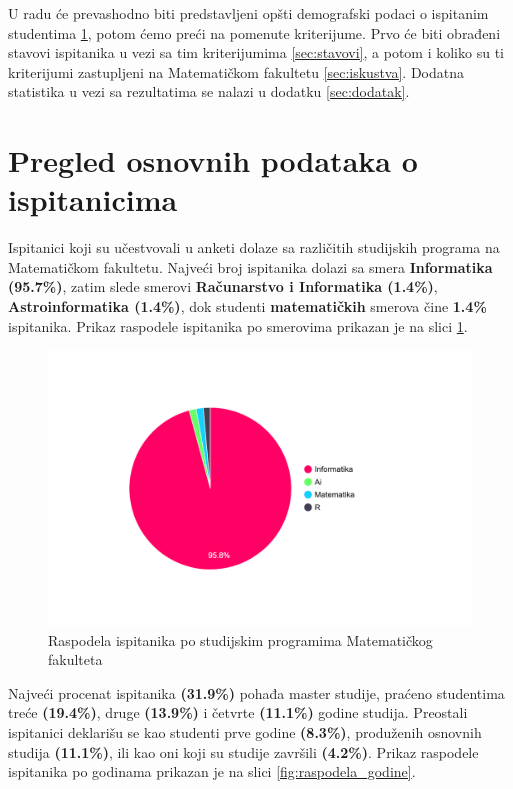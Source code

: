 \documentclass[a4paper]{article}
\begin{document}
U radu će prevashodno biti predstavljeni opšti demografski podaci o ispitanim studentima \ref{sec:demografija}, potom ćemo preći na pomenute kriterijume. Prvo će biti obrađeni stavovi ispitanika u vezi sa tim kriterijumima \ref{sec:stavovi}, a potom i koliko su ti kriterijumi zastupljeni na Matematičkom fakultetu \ref{sec:iskustva}. Dodatna statistika u vezi sa rezultatima se nalazi u dodatku \ref{sec:dodatak}.


\section{Pregled osnovnih podataka o ispitanicima}
\label{sec:demografija}
Ispitanici koji su učestvovali u anketi dolaze sa različitih studijskih programa na Matematičkom fakultetu. Najveći broj ispitanika dolazi sa smera \textbf{Informatika (95.7\%)}, zatim slede smerovi \textbf{Računarstvo i Informatika (1.4\%)}, \textbf{Astroinformatika (1.4\%)}, dok studenti \textbf{matematičkih} smerova čine \textbf{1.4\%} ispitanika. Prikaz raspodele ispitanika po smerovima prikazan je na slici \ref{fig:raspodela_smerovi}. 

\begin{figure}[H]
    \centering
    \includegraphics[width=0.7\linewidth]{Slike/PieChartSmerovi.png}
    \caption{Raspodela ispitanika po studijskim programima Matematičkog fakulteta}
    \label{fig:raspodela_smerovi}
\end{figure}


Najveći procenat ispitanika \textbf{(31.9\%)} pohađa master studije, praćeno studentima treće \textbf{(19.4\%)}, druge \textbf{(13.9\%)} i četvrte \textbf{(11.1\%)} godine studija. Preostali ispitanici deklarišu se kao studenti prve godine \textbf{(8.3\%)}, produženih osnovnih studija \textbf{(11.1\%)}, ili kao oni koji su studije završili \textbf{(4.2\%)}. Prikaz raspodele ispitanika po godinama prikazan je na slici \ref{fig:raspodela_godine}.
\end{document}
